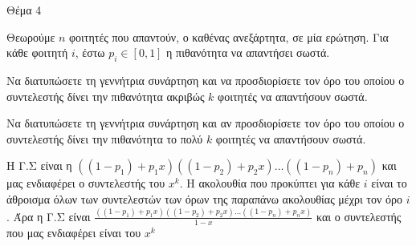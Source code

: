 \documentclass{assignment}
\begin{document}
\begin{problem}{Θέμα 4}

Θεωρούμε $n$ φοιτητές που απαντούν, ο καθένας ανεξάρτητα, σε μία ερώτηση. Για κάθε φοιτητή $i$, έστω $p_i \in [0,1]$ η πιθανότητα
να απαντήσει σωστά.

 Να διατυπώσετε τη γεννήτρια συνάρτηση και να προσδιορίσετε τον όρο του οποίου ο συντελεστής δίνει την πιθανότητα 
ακριβώς $k$ φοιτητές να απαντήσουν σωστά.

 Να διατυπώσετε τη γεννήτρια συνάρτηση και αν προσδιορίσετε τον όρο του οποίου ο συντελεστής δίνει την πιθανότητα
το πολύ $k$ φοιτητές να απαντήσουν σωστά.

\solution

\answer Η Γ.Σ είναι η $((1-p_1) + p_1x)((1-p_2) + p_2x)\dots((1-p_n) + p_n)$ και μας ενδιαφέρει ο συντελεστής του $x^k$.
\answer Η ακολουθία που προκύπτει για κάθε $i$ είναι το άθροισμα όλων των συντελεστών των όρων της παραπάνω ακολουθίας μέχρι
τον όρο $i$. Άρα η Γ.Σ είναι $\frac{((1-p_1) + p_1x)((1-p_2) + p_2x)\dots((1-p_n) + p_nx)}{1-x}$ και ο συντελεστής που μας 
ενδιαφέρει είναι του $x^k$
\end{problem}
\end{document}
